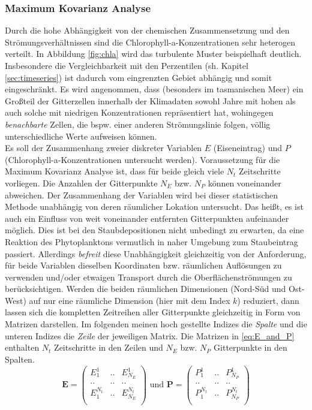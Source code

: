 \documentclass[12pt,a4paper,onecolumn]{scrartcl}
\begin{document}
\subsubsection{Maximum Kovarianz Analyse} \label{sec:mca}
Durch die hohe Abhängigkeit von der chemischen Zusammensetzung und den Strömungsverhältnissen sind die Chlorophyll-a-Konzentrationen sehr heterogen verteilt. In Abbildung \ref{fig:chla} wird das turbulente Muster beispielhaft deutlich. Insbesondere die Vergleichbarkeit mit den Perzentilen (sh. Kapitel \ref{sec:timeseries}) ist dadurch vom eingrenzten Gebiet abhängig und somit eingeschränkt. Es wird angenommen, dass (besonders im tasmanischen Meer) ein Großteil der Gitterzellen innerhalb der Klimadaten sowohl Jahre mit hohen als auch solche mit niedrigen Konzentrationen repräsentiert hat, wohingegen \textit{benachbarte} Zellen, die bspw. einer anderen Strömungslinie folgen, völlig unterschiedliche Werte aufweisen können. \\
Es soll der Zusammenhang zweier diskreter Variablen $E$ (Eiseneintrag) und $P$ (Chlorophyll-a-Konzentrationen untersucht werden). Voraussetzung für die Maximum Kovarianz Analyse ist, dass für beide gleich viele $N_t$ Zeitschritte vorliegen. Die Anzahlen der Gitterpunkte $N_E$ bzw. $N_P$ können voneinander abweichen. Der Zusammenhang der Variablen wird bei dieser statistischen Methode unabhängig von deren räumlicher Lokation untersucht. Das heißt, es ist auch ein Einfluss von weit voneinander entfernten Gitterpunkten aufeinander möglich. Dies ist bei den Staubdepositionen nicht unbedingt zu erwarten, da eine Reaktion des Phytoplanktons vermutlich in naher Umgebung zum Staubeintrag passiert. Allerdings \textit{befreit} diese Unabhängigkeit gleichzeitig von der Anforderung, für beide Variablen dieselben Koordinaten bzw. räumlichen Auflösungen zu verwenden und/oder etwaigen Transport durch die Oberflächenströmungen zu berücksichtigen. Werden die beiden räumlichen Dimensionen (Nord-Süd und Ost-West) auf nur eine räumliche Dimension (hier mit dem  Index $k$) reduziert, dann lassen sich die kompletten  Zeitreihen aller Gitterpunkte gleichzeitig in Form von Matrizen darstellen. Im folgenden meinen hoch gestellte Indizes die \textit{Spalte} und die unteren Indizes die \textit{Zeile} der jeweiligen Matrix. Die Matrizen in \ref{eq:E_and_P} enthalten $N_t$ Zeitschritte in den Zeilen und $N_E$ bzw. $N_P$ Gitterpunkte in den Spalten.
\begin{equation}
\textbf{E} = \begin{pmatrix} E_{1}^1 & .. & E_{N_E}^1 \\ .. & .. & .. \\ E_{1}^{N_t} & .. & E_{N_E}^{N_t} \\ \end{pmatrix} \text{ und } \textbf{P} = \begin{pmatrix} P_{1}^1 & .. & P_{N_P}^1 \\ .. & .. & .. \\ P_{1}^{N_t} & .. & P_{N_P}^{N_t} \\ \end{pmatrix} \label{eq:E_and_P}
\end{equation}
\end{document}
